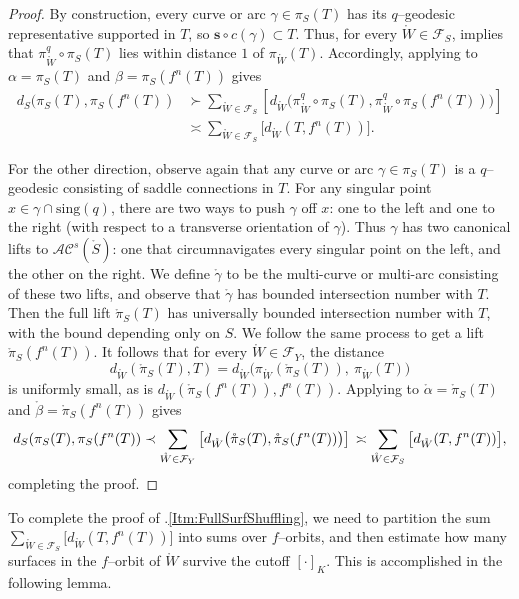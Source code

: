 \documentclass[11pt,letterpaper]{amsart}
\newcommand{\sing}{\mathrm{sing}}
\newcommand{\mc}{\mathcal}
\newcommand{\mr}{\mathring}
\newcommand{\psub}{\mr W}
\numberwithin{equation}{section}
\theoremstyle{definition}
\newcommand{\AC}{\mathcal{AC}}
\begin{document}
\begin{proof}
By construction, every curve or arc $\gamma \in \pi_S(T)$ has its $q$--geodesic representative supported in $T$, so $\mathbf{s} \circ c (\gamma) \subset T$. Thus, for every $\psub \in \mc F_S$,  implies that $\pi_{\psub}^q \circ \pi_S(T)$ lies within distance $1$ of $\pi_{\psub}(T)$. Accordingly, applying  to $\alpha =  \pi_S(T)$ and 
$\beta =  \pi_S(f^n(T))$
gives
\begin{align*}
d_S ( \pi_S(T), \pi_S(f^n(T))
&\succ \sum_{\psub \in \mc F_S} \left[ d_{\psub} \Big( \pi_{\psub}^q \circ \pi_S(T), \pi_{\psub}^q \circ \pi_S(f^n(T)) \Big) \right] \\
&\asymp
\sum_{\psub \in \mc F_S} \big[ d_{\psub}(T, f^n(T)) \big].
\end{align*}

For the other direction, observe again that any curve or arc $\gamma \in \pi_S(T)$ is a $q$--geodesic consisting of saddle connections in $T$. For any singular point $x \in \gamma \cap \sing(q)$, there are two ways to push $\gamma$ off $x$: one to the left and one to the right (with respect to a transverse orientation of $\gamma$).
Thus $\gamma$ has two canonical lifts to $\AC^s(\mr S)$: one that circumnavigates every singular point on the left, and the other on the right. We define $\mr \gamma$ to be the multi-curve or multi-arc consisting of these two lifts, and observe that $\mr \gamma$ has bounded intersection number with $T$. Then the full lift $\mr \pi_S(T)$ has universally bounded intersection number with $T$, with the bound depending only on $S$. We follow the same process to get a lift $\mr \pi_S(f^n(T))$.
It follows that for every $\psub \in \mc F_Y$, the distance
\[
d_{\psub} (\mr{\pi}_S(T), T) = d_{\psub} \big( \pi_{\psub}(\mr{\pi}_S(T)), \: \pi_{\psub}(T) \big)
\]
is uniformly small, as is $d_{\psub} (\mr{\pi}_S(f^n(T)), f^n(T))$. Applying  to $\mr \alpha =  \mr \pi_S(T)$ and 
$\mr \beta = \mr \pi_S(f^n(T))$ gives
\[
d_S ( \pi_S(T), \pi_S(f^n(T)) 
\prec \sum_{\psub \in \mc F_Y} \left[ d_{\psub} \big( \mr{\pi}_S(T), \mr{\pi}_S(f^n(T)) \big) \right] \\
\asymp \sum_{\psub \in \mc F_S} \big[ d_{\psub}(T, f^n(T)) \big],
\]
completing the proof.
\end{proof}

To complete the proof of .\eqref{Itm:FullSurfShuffling}, we need to partition the sum $ \sum_{\psub \in \mc F_S} \big[ d_{\psub}(T, f^n(T)) \big]$ into sums over $f$--orbits, and then estimate how many surfaces in the $f$--orbit of $\psub$ survive the cutoff $[ \cdot ]_K$. This is accomplished in the following lemma.
\end{document}
